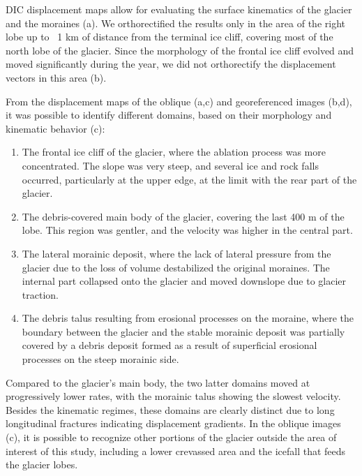 DIC displacement maps allow for evaluating the surface kinematics of the glacier and the
moraines (a).
We orthorectified the results only in the area of the right lobe up
to ~1 km of distance from the terminal ice cliff, covering most of the north lobe of the
glacier.
Since the morphology of the frontal ice cliff evolved and moved significantly
during the year, we did not orthorectify the displacement vectors in this area
(b).

From the displacement maps of the oblique (a,c) and
georeferenced images (b,d), it was possible to
identify different domains, based on their morphology and kinematic behavior
(c):
\begin{enumerate}
  \item The frontal ice cliff of the glacier, where the ablation process was more
        concentrated. The slope was very steep, and several ice and rock falls occurred,
        particularly at the upper edge, at the limit with the rear part of the glacier.
  \item The debris-covered main body of the glacier, covering the last 400 m of the
        lobe. This region was gentler, and the velocity was higher in the central part.
  \item The lateral morainic deposit, where the lack of lateral pressure from the
        glacier due to the loss of volume destabilized the original moraines. The
        internal part
        collapsed onto the glacier and moved downslope due to glacier traction.
  \item The debris talus resulting from erosional processes on the moraine, where the
        boundary between the glacier and the stable morainic deposit was partially
        covered by a
        debris deposit formed as a result of superficial erosional processes on the steep
        morainic side.
\end{enumerate}

Compared to the glacier's main body, the two latter domains moved at progressively lower
rates, with the morainic talus showing the slowest velocity. Besides the kinematic
regimes, these domains are clearly distinct due to long longitudinal fractures indicating
displacement gradients. In the oblique images (c), it
is possible to recognize other portions of the glacier outside the area of interest of
this study, including a lower crevassed area and the icefall that feeds the glacier
lobes.

